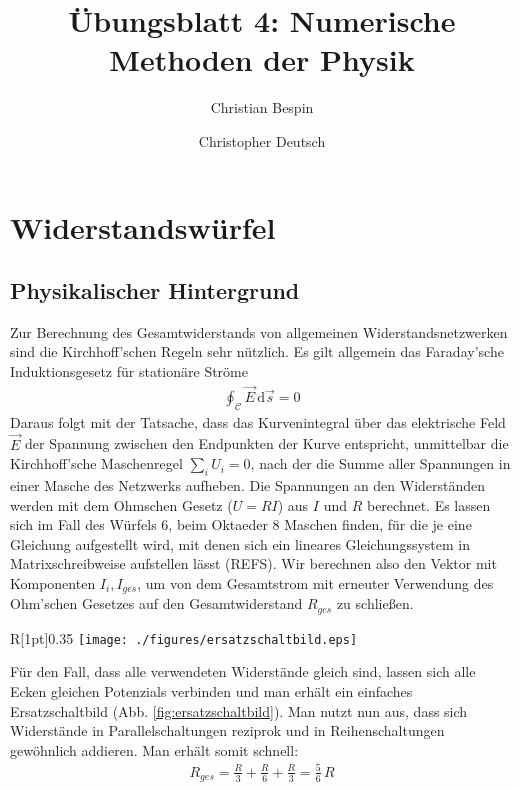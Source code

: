 \documentclass[10pt,a4paper]{article}
\author{Christian Bespin \and Christopher Deutsch}
\title{Übungsblatt 4: Numerische Methoden der Physik}
\begin{document}
\maketitle

\setcounter{section}{1}

\section{Widerstandswürfel}

\subsection{Physikalischer Hintergrund}

Zur Berechnung des Gesamtwiderstands von allgemeinen Widerstandsnetzwerken sind die Kirchhoff'schen Regeln sehr nützlich. Es gilt allgemein das Faraday'sche Induktionsgesetz für stationäre Ströme
\begin{align}
\oint_{\mathcal{C}} \vec{E}\,\mathrm{d}\vec{s} = 0
\end{align}
Daraus folgt mit der Tatsache, dass das Kurvenintegral über das elektrische Feld $\vec{E}$ der Spannung zwischen den Endpunkten der Kurve entspricht, unmittelbar die Kirchhoff'sche Maschenregel $\sum_i U_i=0$, nach der die Summe aller Spannungen in einer Masche des Netzwerks aufheben.
Die Spannungen an den Widerständen werden mit dem Ohmschen Gesetz ($U=R I$) aus $I$ und $R$ berechnet. Es lassen sich im Fall des Würfels $6$, beim Oktaeder $8$ Maschen finden, für die je eine Gleichung aufgestellt wird, mit denen sich ein lineares Gleichungssystem in Matrixschreibweise aufstellen lässt (REFS). Wir berechnen also den Vektor mit Komponenten $I_i, I_{ges}$, um von dem Gesamtstrom mit erneuter Verwendung des Ohm'schen Gesetzes auf den Gesamtwiderstand $R_{ges}$ zu schließen.
\begin{wrapfigure}[16]{R}[1pt]{0.35\textwidth}
\centering
\texttt{[image: ./figures/ersatzschaltbild.eps]}
\caption{Schaltbild für gleiche Widerstände $R$}
\label{fig:ersatzschaltbild}
\end{wrapfigure}

\noindent Für den Fall, dass alle verwendeten Widerstände gleich sind, lassen sich alle Ecken gleichen Potenzials verbinden und man erhält ein einfaches Ersatzschaltbild (Abb. \ref{fig:ersatzschaltbild}). Man nutzt nun aus, dass sich Widerstände in Parallelschaltungen reziprok und in Reihenschaltungen gewöhnlich addieren. Man erhält somit schnell:
\begin{align}
R_{ges}=\frac{R}{3}+\frac{R}{6}+\frac{R}{3}=\frac{5}{6}\,R
\end{align}
\end{document}
